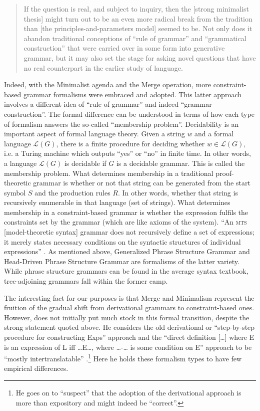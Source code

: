 \documentclass[output=paper]{langscibook}
\begin{document}
\begin{quote}
If the question is real, and subject to inquiry, then the [strong minimalist thesis] might turn out to be an even more radical break from the tradition than [the principles-and-parameters model] seemed to be. Not only does it abandon traditional conceptions of ``rule of grammar'' and ``grammatical construction'' that were carried over in some form into generative grammar, but it may also set the stage for asking novel questions that have no real counterpart in the earlier study of language. \citep[92]{Chomsky2000}
\end{quote}

Indeed, with the Minimalist agenda and the Merge operation, more constraint-based grammar formalisms were embraced and adopted. This latter approach involves a different idea of ``rule of grammar'' and indeed ``grammar construction''. The formal difference can be understood in terms of how each type of formalism answers the so-called ``membership problem''. Decidability is an important aspect of formal language theory. Given a string $w$ and a formal language $\mathcal{L}(G)$, there is a finite procedure for deciding whether $w\in\mathcal{L}(G),$ i.e. a Turing machine which outputs {}``yes'' or {}``no'' in finite time. In other words, a language $\mathcal{L}(G)$ is decidable if
$G$ is a decidable grammar. This is called the membership problem. What determines membership in a traditional proof-theoretic grammar is whether or not that string can be generated from the start symbol $S$ and the production rules $R$. In other words, whether that string is recursively enumerable in that language (set of strings). What determines membership in a constraint-based grammar is whether the expression fulfils the constraints set by the grammar (which are like axioms of the system). ``An \textsc{mts} [model-theoretic syntax] grammar does not recursively define a set of expressions; it merely states necessary conditions on the syntactic structures of individual expressions'' \citep[19]{Pullum2001}. As mentioned above, Generalized Phrase Structure Grammar and Head-Driven Phrase Structure Grammar are formalisms of the latter variety. While phrase structure grammars can be found in the average syntax textbook, tree-adjoining grammars fall within the former camp.

The interesting fact for our purposes is that Merge and Minimalism represent the fruition of the gradual shift from derivational grammars to constraint-based ones. However, \cite{Chomsky2000} does not initially put much stock in this formal transition, despite the strong statement quoted above. He considers the old derivational or ``step-by-step procedure for constructing Exps'' approach and the ``direct definition […] where E is an expression of L iff …E…, where …-… is some condition on E'' approach to be ``mostly intertranslatable'' \citep[99]{Chomsky2000}.\footnote{He goes on to ``suspect'' that the adoption of the derivational approach is more than expository and might indeed be ``correct''.} Here he holds these formalism types to have few empirical differences.
\end{document}
